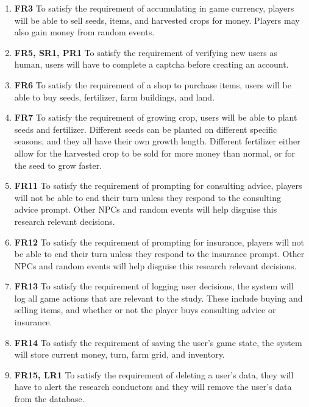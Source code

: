 \documentclass[12pt, titlepage]{article}
\begin{document}
\begin{enumerate}
    \item \textbf{FR3} To satisfy the requirement of accumulating in game currency, players will be able to sell seeds, items, and harvested crops for money. Players may also gain money from random events.\\
    \item \textbf{FR5, SR1, PR1} To satisfy the requirement of verifying new users as human, users will have to complete a captcha before creating an account.\\
    \item \textbf{FR6} To satisfy the requirement of a shop to purchase items, users will be able to buy seeds, fertilizer, farm buildings, and land.\\
    \item \textbf{FR7} To satisfy the requirement of growing crop, users will be able to plant seeds and fertilizer. Different seeds can be planted on different specific seasons, and they all have their own growth length. Different fertilizer either allow for the harvested crop to be sold for more money than normal, or for the seed to grow faster.\\
    \item \textbf{FR11} To satisfy the requirement of prompting for consulting advice, players will not be able to end their turn unless they respond to the consulting advice prompt. Other NPCs and random events will help disguise this research relevant decisions.\\
    \item \textbf{FR12} To satisfy the requirement of prompting for insurance, players will not be able to end their turn unless they respond to the insurance prompt. Other NPCs and random events will help disguise this research relevant decisions.\\
    \item \textbf{FR13} To satisfy the requirement of logging user decisions, the system will log all game actions that are relevant to the study. These include buying and selling items, and whether or not the player buys consulting advice or insurance.\\
    \item \textbf{FR14} To satisfy the requirement of saving the user's game state, the system will store current money, turn, farm grid, and inventory.\\
    \item \textbf{FR15, LR1} To satisfy the requirement of deleting a user's data, they will have to alert the research conductors and they will remove the user's data from the database.\\

\end{enumerate}
\end{document}
